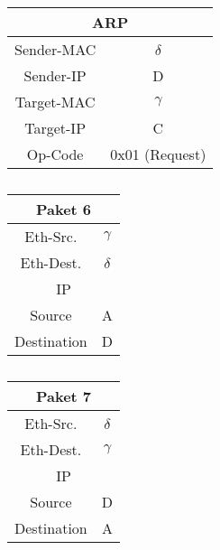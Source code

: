 \begin{table}[p]
\begin{minipage}[t]{0.49\linewidth}
\begin{tabular}{|c|c|}
            \hline
            \multicolumn{2}{|c|}{ARP} \\
            \hline
            Sender-MAC & $\delta$ \\
            \hline
            Sender-IP  & D \\
            \hline
            Target-MAC & $\gamma$ \\
            \hline
            Target-IP & C \\
            \hline
            Op-Code & 0x01 (Request) \\
            \hline
        \end{tabular}
        \caption{}
        \label{tab:4.12.5}
    \end{minipage}
\end{table}

\begin{table}[p]
    \begin{minipage}[t]{0.32\linewidth}
        \centering
        \begin{tabular}{|c|c|}
            \hline
            \multicolumn{2}{|c|}{Paket 6} \\
            \hline
            Eth-Src.  & $\gamma$ \\
            \hline
            Eth-Dest. & $\delta$ \\
            \hline
            \multicolumn{2}{|c|}{IP} \\
            \hline
            Source & A \\
            \hline
            Destination & D \\
            \hline
        \end{tabular}
        \caption{}
        \label{tab:4.12.6}
    \end{minipage}
    \begin{minipage}[t]{0.32\linewidth}
        \centering
        \begin{tabular}{|c|c|}
            \hline
            \multicolumn{2}{|c|}{Paket 7} \\
            \hline
            Eth-Src.  & $\delta$ \\
            \hline
            Eth-Dest. & $\gamma$ \\
            \hline
            \multicolumn{2}{|c|}{IP} \\
            \hline
            Source & D \\
            \hline
            Destination & A \\
            \hline
        \end{tabular}

\end{minipage}
\end{table}
